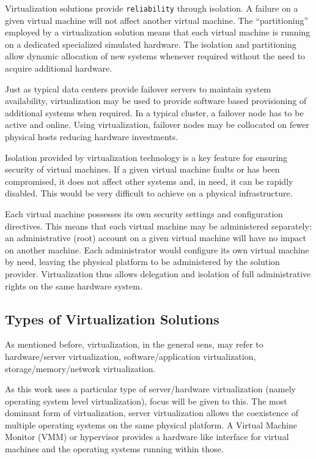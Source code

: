 Virtualization solutions provide \texttt{reliability} through isolation. A
failure on a given virtual machine will not affect another virtual machine.
The ``partitioning'' employed by a virtualization solution means that each
virtual machine is running on a dedicated specialized simulated hardware. The
isolation and partitioning allow dynamic allocation of new systems whenever
required without the need to acquire additional hardware.

Just as typical data centers provide failover servers to maintain system
availability, virtualization may be used to provide software based
provisioning of additional systems when required. In a typical cluster, a
failover node has to be active and online. Using virtualization, failover
nodes may be collocated on fewer physical hosts reducing hardware investments.

Isolation provided by virtualization technology is a key feature for ensuring
security of virtual machines. If a given virtual machine faults or has been
compromised, it does not affect other systems and, in need, it can be rapidly
disabled. This would be very difficult to achieve on a physical
infrastructure.

Each virtual machine possesses its own security settings and configuration
directives. This means that each virtual machine may be administered
separately: an administrative (root) account on a given virtual machine will
have no impact on another machine. Each administrator would configure its own
virtual machine by need, leaving the physical platform to be administered by
the solution provider. Virtualization thus allows delegation and isolation of
full administrative rights on the same hardware system.

\subsection{Types of Virtualization Solutions}

As mentioned before, virtualization, in the general sens, may refer to
hardware/server virtualization, software/application virtualization,
storage/memory/network virtualization.

As this work uses a particular type of server/hardware virtualization (namely
operating system level virtualization), focus will be given to this. The most
dominant form of virtualization, server virtualization allows the coexistence
of multiple operating systems on the same physical platform. A Virtual Machine
Monitor (VMM) or hypervisor provides a hardware like interface for virtual
machines and the operating systems running within those.

